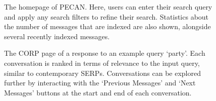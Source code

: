 \begin{figure}[t!]
	\caption{The homepage of PECAN. Here, users can enter their search query and apply any search filters to refine their search. Statistics about the number of messages that are indexed are also shown, alongside several recently indexed messages.}
	\label{fig:homepage}
\end{figure}

\begin{figure}[t!]
	\caption{The CORP page of a response to an example query `party'. Each conversation is ranked in terms of relevance to the input query, similar to contemporary SERPs. Conversations can be explored further by interacting with the `Previous Messages' and `Next Messages' buttons at the start and end of each conversation.}
	\label{fig:searching}
\end{figure}


